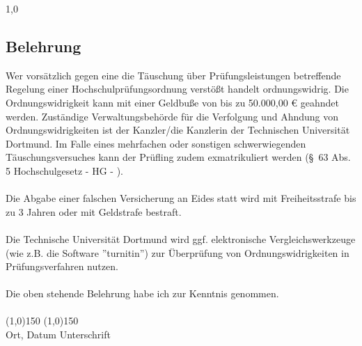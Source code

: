 \begin{spacing}{1,0}
\subsection*{Belehrung}
Wer vorsätzlich gegen eine die T\"auschung über Prüfungsleistungen betreffende Regelung einer Hochschulprüfungsordnung
verstößt handelt ordnungswidrig. Die Ordnungswidrigkeit kann mit einer Geldbu\ss e von bis zu 50.000,00 \euro{} geahndet werden. Zuständige Verwaltungsbehörde für die Verfolgung und Ahndung von Ordnungswidrigkeiten ist
der Kanzler/die Kanzlerin der Technischen Universit\"at Dortmund. Im Falle eines mehrfachen oder sonstigen schwerwiegenden Täuschungsversuches kann der Prüfling zudem exmatrikuliert werden (\S\ 63 Abs. 5 Hochschulgesetz - HG - ).\\
\ \\
Die Abgabe einer falschen Versicherung an Eides statt wird mit Freiheitsstrafe bis zu 3 Jahren oder mit Geldstrafe bestraft.\\
\ \\
Die Technische Universit\"at Dortmund wird ggf. elektronische Vergleichswerkzeuge (wie z.B. die Software ''turnitin'') zur \"Uberpr\"ufung von Ordnungswidrigkeiten in Pr\"ufungsverfahren nutzen.\\
\ \\
Die oben stehende Belehrung habe ich zur Kenntnis genommen.
\vspace*{1cm}
\ \\
\ \\
\line(1,0){150} \hfill \line(1,0){150}\\
Ort, Datum \hfill Unterschrift \hspace*{3cm}
\vspace*{\fill}
\end{spacing}
